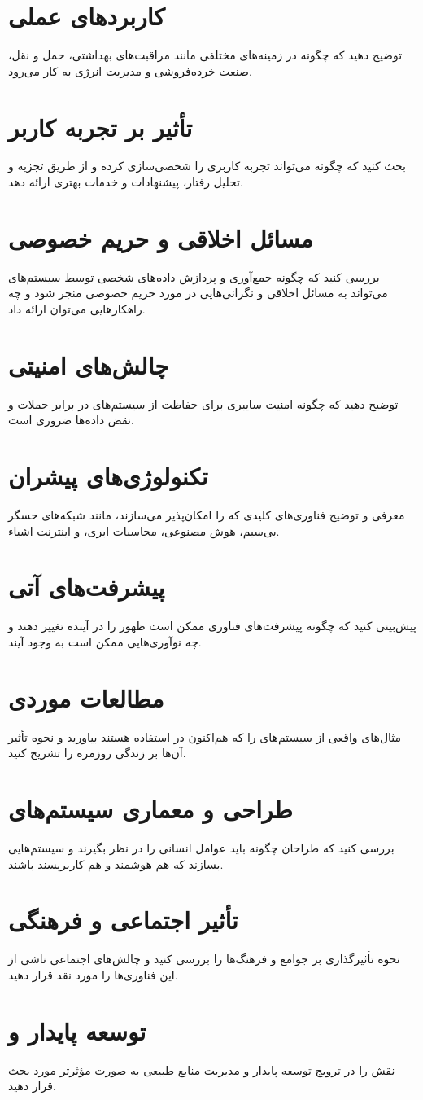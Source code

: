 \section*{کاربردهای عملی }
توضیح دهید که چگونه  در زمینه‌های مختلفی مانند مراقبت‌های بهداشتی، حمل و نقل، صنعت خرده‌فروشی و مدیریت انرژی به کار می‌رود.

\section*{تأثیر  بر تجربه کاربر}
بحث کنید که چگونه  می‌تواند تجربه کاربری را شخصی‌سازی کرده و از طریق تجزیه و تحلیل رفتار، پیشنهادات و خدمات بهتری ارائه دهد.

\section*{مسائل اخلاقی و حریم خصوصی}
بررسی کنید که چگونه جمع‌آوری و پردازش داده‌های شخصی توسط سیستم‌های  می‌تواند به مسائل اخلاقی و نگرانی‌هایی در مورد حریم خصوصی منجر شود و چه راهکارهایی می‌توان ارائه داد.

\section*{چالش‌های امنیتی}
توضیح دهید که چگونه امنیت سایبری برای حفاظت از سیستم‌های  در برابر حملات و نقض داده‌ها ضروری است.

\section*{تکنولوژی‌های پیشران}
معرفی و توضیح فناوری‌های کلیدی که  را امکان‌پذیر می‌سازند، مانند شبکه‌های حسگر بی‌سیم، هوش مصنوعی، محاسبات ابری، و اینترنت اشیاء.

\section*{پیشرفت‌های آتی}
پیش‌بینی کنید که چگونه پیشرفت‌های فناوری ممکن است ظهور  را در آینده تغییر دهند و چه نوآوری‌هایی ممکن است به وجود آیند.

\section*{مطالعات موردی}
مثال‌های واقعی از سیستم‌های  را که هم‌اکنون در استفاده هستند بیاورید و نحوه تأثیر آن‌ها بر زندگی روزمره را تشریح کنید.

\section*{طراحی و معماری سیستم‌های }
بررسی کنید که طراحان چگونه باید عوامل انسانی را در نظر بگیرند و سیستم‌هایی بسازند که هم هوشمند و هم کاربرپسند باشند.

\section*{تأثیر اجتماعی و فرهنگی}
نحوه تأثیرگذاری  بر جوامع و فرهنگ‌ها را بررسی کنید و چالش‌های اجتماعی ناشی از این فناوری‌ها را مورد نقد قرار دهید.

\section*{توسعه پایدار و }
نقش  را در ترویج توسعه پایدار و مدیریت منابع طبیعی به صورت مؤثرتر مورد بحث قرار دهید.
	